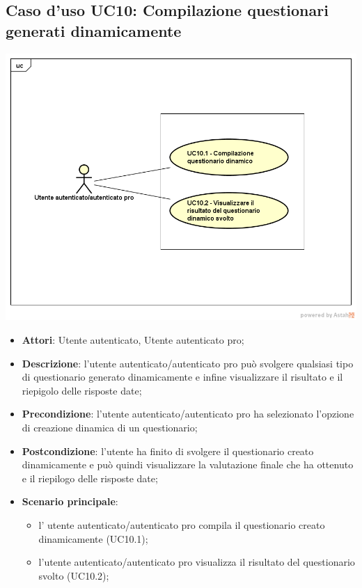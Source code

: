 \subsection{Caso d'uso UC10: Compilazione questionari generati dinamicamente}
\begin{center}
\includegraphics[scale=0.5]{UML/UC10.png}
\end{center}
\begin{itemize}
\item\textbf{Attori}: Utente autenticato, Utente autenticato pro;
\item\textbf{Descrizione}: l'utente autenticato/autenticato pro può svolgere qualsiasi tipo di questionario generato dinamicamente e infine visualizzare il risultato e il riepigolo delle risposte date;
\item\textbf{Precondizione}: l'utente autenticato/autenticato pro ha selezionato l'opzione di creazione dinamica di un questionario;
\item\textbf{Postcondizione}: l'utente ha finito di svolgere il questionario creato dinamicamente e può quindi visualizzare la valutazione finale che ha ottenuto e il riepilogo delle risposte date;
\item\textbf{Scenario principale}:
	\begin{itemize}
		\item l' utente autenticato/autenticato pro compila il questionario creato dinamicamente (UC10.1);
		\item l'utente autenticato/autenticato pro visualizza il risultato del questionario svolto (UC10.2);
	\end{itemize}
\end{itemize}

